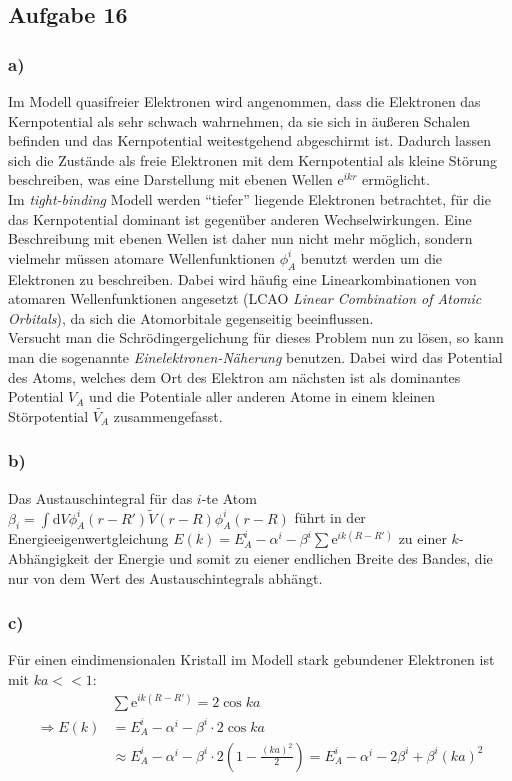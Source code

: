 \subsection*{Aufgabe 16}
\subsubsection*{a)}
Im Modell quasifreier Elektronen wird angenommen, dass die Elektronen das Kernpotential als sehr schwach wahrnehmen, da sie sich in äußeren Schalen befinden und das Kernpotential weitestgehend abgeschirmt ist. Dadurch lassen sich die Zustände als freie Elektronen mit dem Kernpotential als kleine Störung beschreiben, was eine Darstellung mit ebenen Wellen $\mathrm{e}^{ikr}$ ermöglicht.\\
Im \textit{tight-binding} Modell werden "`tiefer"' liegende Elektronen betrachtet, für die das Kernpotential dominant ist gegenüber anderen Wechselwirkungen. Eine Beschreibung mit ebenen Wellen ist daher nun nicht mehr möglich, sondern vielmehr müssen atomare Wellenfunktionen $\phi_A^i$ benutzt werden um die Elektronen zu beschreiben. Dabei wird häufig eine Linearkombinationen von atomaren Wellenfunktionen angesetzt (LCAO \textit{Linear Combination of Atomic Orbitals}), da sich die Atomorbitale gegenseitig beeinflussen.\\
Versucht man die Schrödingergelichung für dieses Problem nun zu lösen, so kann man die sogenannte \textit{Einelektronen-Näherung} benutzen. Dabei wird das Potential des Atoms, welches dem Ort des Elektron am nächsten ist als dominantes Potential $V_A$ und die Potentiale aller anderen Atome in einem kleinen Störpotential $\tilde{V_A}$ zusammengefasst.\\

\subsubsection*{b)}
Das Austauschintegral für das $i$-te Atom $\beta_i = \int \mathrm{d}V \phi_A^i(r-R')\tilde{V}(r-R)\phi_A^i(r-R)$ führt in der Energieeigenwertgleichung $E(k) = E_A^i -\alpha^i-\beta^i\sum \mathrm{e}^{ik(R-R')}$ zu einer $k$-Abhängigkeit der Energie und somit zu eiener endlichen Breite des Bandes, die nur von dem Wert des Austauschintegrals abhängt.
\subsubsection*{c)}
Für einen eindimensionalen Kristall im Modell stark gebundener Elektronen ist mit $ka<<1$:
\begin{align*}
&\sum \mathrm{e}^{ik(R-R')} = 2\cos{k a} \\
\Rightarrow E(k) & = E_A^i -\alpha^i-\beta^i\cdot2\cos{k a}\\
 & \approx E_A^i -\alpha^i-\beta^i\cdot2\left(1-\frac{(k a)^2}{2}\right)
 = E_A^i -\alpha^i- 2 \beta^i + \beta^i(k a)^2
\end{align*}

